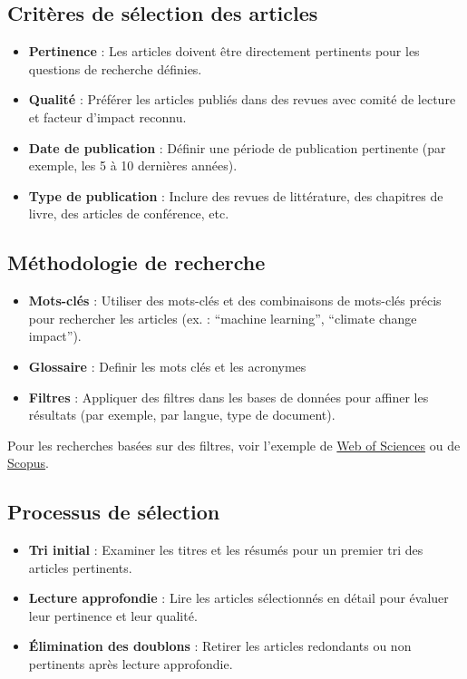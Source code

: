\documentclass[review]{elsarticle}
\begin{document}
\subsection{Critères de sélection des articles}
\begin{itemize}
    \item \textbf{Pertinence} : Les articles doivent être directement pertinents pour les questions de recherche définies.
    \item \textbf{Qualité} : Préférer les articles publiés dans des revues avec comité de lecture et facteur d'impact reconnu.
    \item \textbf{Date de publication} : Définir une période de publication pertinente (par exemple, les 5 à 10 dernières années).
    \item \textbf{Type de publication} : Inclure des revues de littérature, des chapitres de livre, des articles de conférence, etc.
\end{itemize}
\subsection{Méthodologie de recherche}
\begin{itemize}
    \item \textbf{Mots-clés} : Utiliser des mots-clés et des combinaisons de mots-clés précis pour rechercher les articles (ex. : ``machine learning'', ``climate change impact'').
    \item \textbf{Glossaire }: Definir les mots clés et les acronymes
    \item \textbf{Filtres} : Appliquer des filtres dans les bases de données pour affiner les résultats (par exemple, par langue, type de document).
\end{itemize}
Pour les recherches basées sur des filtres, voir l'exemple de  \href{https://www.hesge.ch/heg/sites/default/files/infotheque/web_of_science_guide.pdf}{Web of Sciences} ou  de \href{https://service.elsevier.com/app/answers/detail/a_id/11365/supporthub/scopus/}{Scopus}.
\subsection{Processus de sélection}
\begin{itemize}
    \item \textbf{Tri initial} : Examiner les titres et les résumés pour un premier tri des articles pertinents.
    \item \textbf{Lecture approfondie} : Lire les articles sélectionnés en détail pour évaluer leur pertinence et leur qualité.
    \item \textbf{Élimination des doublons} : Retirer les articles redondants ou non pertinents après lecture approfondie.
\end{itemize}
\end{document}
